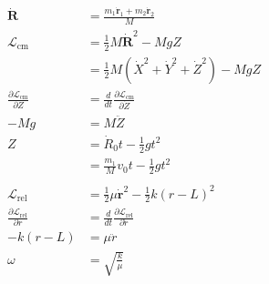 \documentclass{article}
\renewcommand{\vec}[1]{\boldsymbol{\mathbf{#1}}}
\newcommand{\dvec}[1]{\dot{\vec{#1}}}
\begin{document}
\subsection{}

\begin{align*}
  \dvec{R}                                           & = \frac{m_1 \dvec{r}_1 + m_2 \dvec{r}_2}{M}                                                                   \\
  \mathcal{L}_\text{cm}                              & = \frac{1}{2} M \dvec{R}^2 - M g Z                                                                            \\
                                                     & = \frac{1}{2} M (\dot{X}^2 + \dot{Y}^2 + \dot{Z}^2) - M g Z                                                   \\
  \frac{\partial \mathcal{L}_\text{cm}}{\partial Z}  & = \frac{d}{d t} \frac{\partial \mathcal{L}_\text{cm}}{\partial \dot{Z}}                                       \\
  -M g                                               & = M \ddot{Z}                                                                                                  \\
  Z                                                  & = \dot{R}_0 t - \frac{1}{2} g t^2                                                                             \\
                                                     & = \frac{m_1}{M} v_0 t - \frac{1}{2} g t^2                                                                     \\ \\
  \mathcal{L}_\text{rel}                             & = \frac{1}{2} \mu \dvec{r}^2 - \frac{1}{2} k (r - L)^2                                                        \\
  \frac{\partial \mathcal{L}_\text{rel}}{\partial r} & = \frac{d}{d t} \frac{\partial \mathcal{L}_\text{rel}}{\partial \dot{r}}                                      \\
  -k (r - L)                                         & = \mu \ddot{r}                                                                                                \\
  \omega                                             & = \sqrt{\frac{k}{\mu}}                                                                                        \\

\end{align*}
\end{document}

